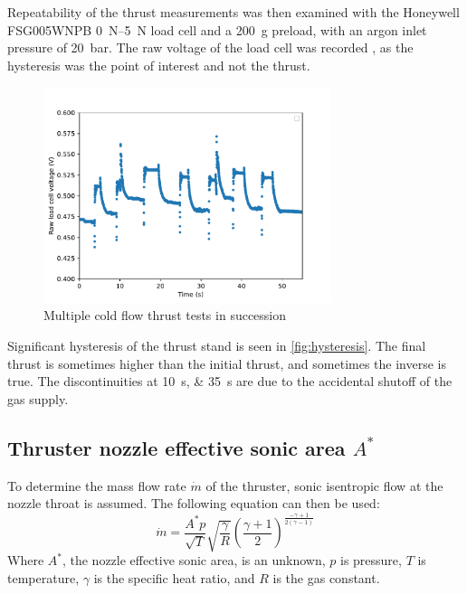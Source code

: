             Repeatability of the thrust measurements was then examined with the Honeywell FSG005WNPB \qtyrange{0}{5}{N} load cell and a \qty{200}{g} preload, with an argon inlet pressure of \qty{20}{bar}. The raw voltage of the load cell was recorded , as the hysteresis was the point of interest and not the thrust.
            \begin{figure}[h]
                \centering
                \includegraphics[width=0.75\textwidth]{assets/4 experiments/hysterisis graph.pdf}
                \caption{Multiple cold flow thrust tests in succession}
                \label{fig:hysteresis}
            \end{figure}
            Significant hysteresis of the thrust stand is seen in \autoref{fig:hysteresis}. The final thrust is sometimes higher than the initial thrust, and sometimes the inverse is true. The discontinuities at \qtylist{10;35}{s} are due to the accidental shutoff of the gas supply.

        \subsection{Thruster nozzle effective sonic area $A^*$}

            To determine the mass flow rate $\dot{m}$ of the thruster,  sonic isentropic flow at the nozzle throat is assumed. The following equation can then be used:
            \begin{equation}
                \dot{m} = \frac{A^* p}{\sqrt{T}}\sqrt{\frac{\gamma}{R}}\left(\frac{\gamma + 1}{2}\right)^{\frac{-\gamma + 1}{2(\gamma-1)}}
            \end{equation}
            Where $A^*$, the nozzle effective sonic area, is an unknown, $p$ is pressure, $T$ is temperature, $\gamma$ is the specific heat ratio, and $R$ is the gas constant.
        
